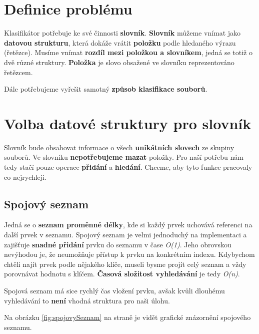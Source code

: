 \documentclass[12pt]{report}
\begin{document}
	\section{Definice problému}
	Klasifikátor potřebuje ke své činnosti \textbf{slovník}. \textbf{Slovník} můžeme vnímat jako \textbf{datovou strukturu}, která dokáže vrátit \textbf{položku} podle hledaného výrazu (řetězce). Musíme vnímat \textbf{rozdíl mezi položkou a slovníkem}, jedná se totiž o dvě různé struktury. \textbf{Položka} je slovo obsažené ve slovníku reprezentováno řetězcem.
	
	Dále potřebujeme vyřešit samotný \textbf{způsob klasifikace souborů}.
	
	\section{Volba datové struktury pro slovník}
	Slovník bude obsahovat informace o všech \textbf{unikátních slovech} ze skupiny souborů. Ve slovníku \textbf{nepotřebujeme mazat} položky. Pro naší potřebu nám tedy stačí pouze operace \textbf{přidání} a \textbf{hledání}. Chceme, aby tyto funkce pracovaly co nejrychleji.
	
		\subsection{Spojový seznam}
		Jedná se o \textbf{seznam proměnné délky}, kde si každý prvek uchovává referenci na další prvek v seznamu. Spojový seznam je velmi jednoduchý na implementaci a zajišťuje \textbf{snadné přidání} prvku do seznamu v čase \textit{O(1)}. Jeho obrovskou nevýhodou je, že neumožňuje přístup k prvku na konkrétním indexu. Kdybychom chtěli najít prvek podle nějakého klíče, museli bysme projít celý seznam a vždy porovnávat hodnotu s klíčem. \textbf{Časová složitost vyhledávání} je tedy \textit{O(n)}. 
		
		Spojová seznam má sice rychlý čas vložení prvku, avšak kvůli dlouhému vyhledávání to \textbf{není} vhodná struktura pro naši úlohu. 
		
		Na obrázku \ref{fig:spojovySeznam} na straně \pageref{fig:spojovySeznam} je vidět grafické znázornění spojového seznamu.
					
\end{document}
